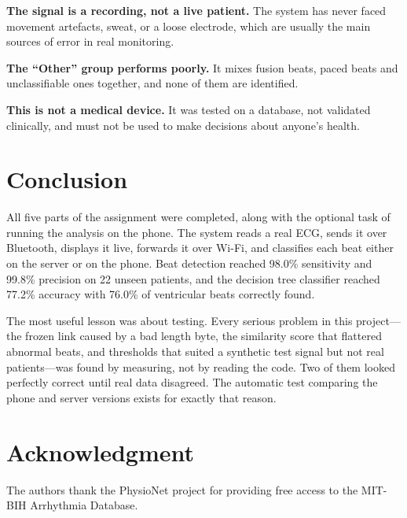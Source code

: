 \documentclass[conference]{IEEEtran}
\begin{document}
\textbf{The signal is a recording, not a live patient.} The system has never
faced movement artefacts, sweat, or a loose electrode, which are usually the main
sources of error in real monitoring.

\textbf{The ``Other'' group performs poorly.} It mixes fusion beats, paced beats
and unclassifiable ones together, and none of them are identified.

\textbf{This is not a medical device.} It was tested on a database, not validated
clinically, and must not be used to make decisions about anyone's health.

\section{Conclusion}

All five parts of the assignment were completed, along with the optional task of
running the analysis on the phone. The system reads a real ECG, sends it over
Bluetooth, displays it live, forwards it over Wi-Fi, and classifies each beat
either on the server or on the phone. Beat detection reached 98.0\% sensitivity
and 99.8\% precision on 22 unseen patients, and the decision tree classifier
reached 77.2\% accuracy with 76.0\% of ventricular beats correctly found.

The most useful lesson was about testing. Every serious problem in this
project---the frozen link caused by a bad length byte, the similarity score that
flattered abnormal beats, and thresholds that suited a synthetic test signal but
not real patients---was found by measuring, not by reading the code. Two of them
looked perfectly correct until real data disagreed. The automatic test comparing
the phone and server versions exists for exactly that reason.

\section*{Acknowledgment}

The authors thank the PhysioNet project for providing free access to the MIT-BIH
Arrhythmia Database.
\end{document}
